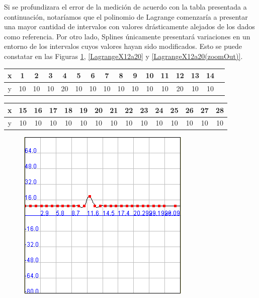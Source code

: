 \documentclass[a4paper]{article}
\begin{document}
Si se profundizara el error de la medición de acuerdo con la tabla presentada a continuación, notaríamos que el polinomio de Lagrange comenzaría a presentar una mayor cantidad de intervalos con valores drásticamente alejados de los dados como referencia. Por otro lado, Splines únicamente presentará variaciones en un entorno de los intervalos cuyos valores hayan sido modificados. Esto se puede  constatar en las Figuras \ref{SplinesX12a20}, \ref{LagrangeX12a20} y  \ref{LagrangeX12a20(zoomOut)}.\\


\begin{tabular}{ | c || c | c | c | c | c |c | c | c | c | c | c | c | c | c | c |}
 \hline                 
   x & 1 & 2 & 3 & 4 & 5 & 6 & 7 & 8 & 9 & 10 & 11 & 12 & 13 & 14 \\
 \hline    
y & 10 & 10& 10& 20& 10& 10& 10& 10& 10& 10& 10& 20& 10 & 10\\
 \hline  
 \end{tabular}

\smallskip

\begin{tabular}{  | c || c | c | c | c | c | c | c | c | c | c | c | c | c | c | }
 \hline                 
   x&15& 16 & 17 & 18 & 19 & 20 & 21 & 22 & 23 & 24 & 25 & 26 & 27 & 28\\
 \hline    
y & 10 & 10 & 10& 10& 10& 10& 10& 10& 10& 10& 10& 10& 10& 10 \\
 \hline  
 \end{tabular}

\begin{figure}
	\caption{}
	\begin{center}
	\includegraphics[scale=1]{imagenes/SplinesX12a20}
	\label{SplinesX12a20}
  \end{center}
\end{figure}
\end{document}
